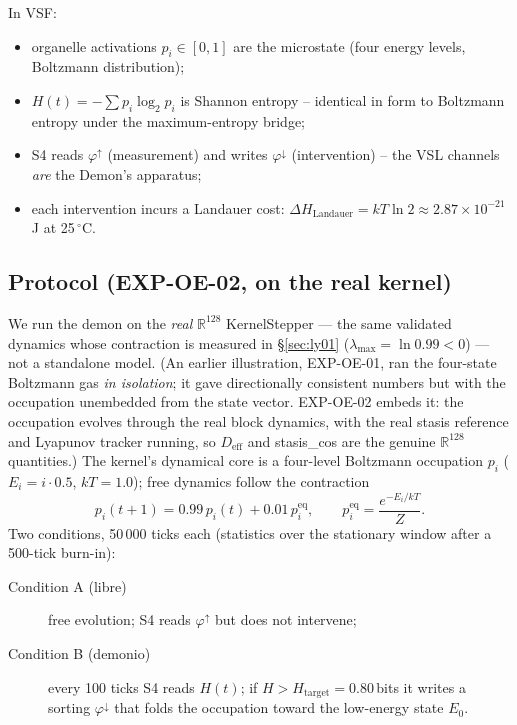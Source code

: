 \documentclass[11pt, a4paper]{article}
\begin{document}
In VSF:
\begin{itemize}
  \item organelle activations $p_i \in [0,1]$ are the microstate (four energy
    levels, Boltzmann distribution);
  \item $H(t) = -\sum p_i \log_2 p_i$ is Shannon entropy -- identical in form
    to Boltzmann entropy under the \citet{jaynes1957information} maximum-entropy bridge;
  \item S4 reads $\varphi^\uparrow$ (measurement) and writes $\varphi^\downarrow$
    (intervention) -- the VSL channels \emph{are} the Demon's apparatus;
  \item each intervention incurs a Landauer cost: $\Delta H_\text{Landauer} =
    kT \ln 2 \approx 2.87 \times 10^{-21}$\,J at 25\,$^\circ$C.
\end{itemize}

\subsection{Protocol (EXP-OE-02, on the real kernel)}

We run the demon on the \emph{real} $\mathbb{R}^{128}$ KernelStepper --- the same
validated dynamics whose contraction is measured in \S\ref{sec:ly01}
($\lambda_\text{max} = \ln 0.99 < 0$) --- not a standalone model. (An earlier
illustration, EXP-OE-01, ran the four-state Boltzmann gas \emph{in isolation};
it gave directionally consistent numbers but with the occupation unembedded from
the state vector. EXP-OE-02 embeds it: the occupation evolves through the real
block dynamics, with the real stasis reference and Lyapunov tracker running, so
$D_\text{eff}$ and stasis\_cos are the genuine $\mathbb{R}^{128}$ quantities.)
The kernel's dynamical core is a four-level Boltzmann occupation $p_i$
($E_i = i \cdot 0.5$, $kT = 1.0$); free dynamics follow the contraction
\[
  p_i(t+1) = 0.99\,p_i(t) + 0.01\,p_i^\text{eq},
  \qquad p_i^\text{eq} = \frac{e^{-E_i/kT}}{Z}.
\]
Two conditions, 50\,000 ticks each (statistics over the stationary window after a
500-tick burn-in):
\begin{description}
  \item[Condition A (libre)] free evolution; S4 reads $\varphi^\uparrow$ but does
    not intervene;
  \item[Condition B (demonio)] every 100 ticks S4 reads $H(t)$; if
    $H > H_\text{target} = 0.80$\,bits it writes a sorting $\varphi^\downarrow$
    that folds the occupation toward the low-energy state $E_0$.
\end{description}
\end{document}
